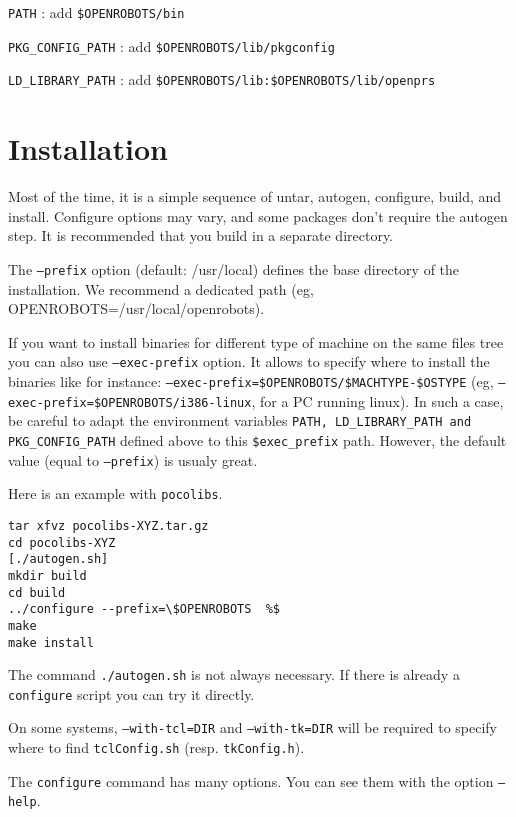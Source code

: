 \texttt{PATH} :  add \texttt{\$OPENROBOTS/bin}

\texttt{PKG\_CONFIG\_PATH} :  add  \texttt{\$OPENROBOTS/lib/pkgconfig}

\texttt{LD\_LIBRARY\_PATH} :  add  \texttt{\$OPENROBOTS/lib:\$OPENROBOTS/lib/openprs}



\section{Installation}
\label{sec|configuration|installation}

Most of the time, it is a simple sequence of untar, autogen, configure,
build, and install. Configure options may vary, and some packages don't
require the autogen step. It is recommended that you build in a separate
directory. 

The \texttt{--prefix} option (default: /usr/local) defines the base directory
of the installation. We recommend a dedicated path (eg,
OPENROBOTS=/usr/local/openrobots).

If you want to install binaries for different type of machine
on the same files tree you can also use \texttt{--exec-prefix}
option. It allows to specify where to install the binaries like for
instance: \texttt{--exec-prefix=\$OPENROBOTS/\$MACHTYPE-\$OSTYPE} (eg,
\texttt{--exec-prefix=\$OPENROBOTS/i386-linux}, for a PC running linux).
In such a case, be careful to adapt the environment variables 
\texttt{PATH, LD\_LIBRARY\_PATH and PKG\_CONFIG\_PATH} defined above to this
\texttt{\$exec\_prefix} path.
However, the default value (equal to \texttt{--prefix}) is usualy great. 


Here is an
example with \texttt{pocolibs}. 

\begin{cartouche}
\begin{verbatim}
tar xfvz pocolibs-XYZ.tar.gz
cd pocolibs-XYZ
[./autogen.sh]
mkdir build
cd build
../configure --prefix=\$OPENROBOTS  %$
make
make install
\end{verbatim}
\end{cartouche}

The command \texttt{./autogen.sh} is not always necessary. If there is
already a \texttt{configure} script  you can try it directly.

On some systems, \texttt{--with-tcl=DIR} and \texttt{--with-tk=DIR} will be
required to specify where to find \texttt{tclConfig.sh} (resp. \texttt{tkConfig.h}). 

The \texttt{configure} command has many options. You can see them with the
option \texttt{--help}. 


